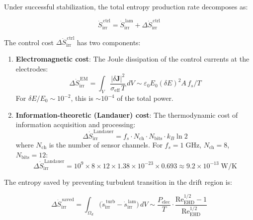 \documentclass[12pt,twocolumn]{article}
\newcommand{\jj}{\mathbf{J}}
\newcommand{\Sdot}{\dot{S}_{\mathrm{irr}}}
\newcommand{\sdot}{\dot{s}_{\mathrm{irr}}}
\newcommand{\Reehd}{\mathrm{Re}_{\mathrm{EHD}}}
\begin{document}
Under successful stabilization, the total entropy production rate
decomposes as:

\begin{equation}
  \Sdot^{\,\mathrm{ctrl}}
  = \Sdot^{\,\mathrm{lam}} + \Delta\Sdot^{\,\mathrm{ctrl}}
  \label{eq:entropy_decomp}
\end{equation}

The control cost $\Delta\Sdot^{\,\mathrm{ctrl}}$ has two components:

\begin{enumerate}
  \item \textbf{Electromagnetic cost}: The Joule dissipation of the
    control currents at the electrodes:
    \begin{equation}
      \Delta\Sdot^{\,\mathrm{EM}}
      = \int_V \frac{|\delta\jj|^2}{\sigma_{\mathrm{eff}}\,T}\,dV
      \sim \varepsilon_0 E_0 (\delta E)^2 A\,f_s / T
      \label{eq:entropy_EM}
    \end{equation}
    For $\delta E / E_0 \sim 10^{-2}$, this is $\sim 10^{-4}$ of
    the total power.

  \item \textbf{Information-theoretic (Landauer) cost}: The
    thermodynamic cost of information acquisition and processing:
    \begin{equation}
      \Delta\Sdot^{\,\mathrm{Landauer}}
      = f_s \cdot N_{\mathrm{ch}} \cdot N_{\mathrm{bits}}
        \cdot k_B \ln 2
      \label{eq:entropy_Landauer}
    \end{equation}
    where $N_{\mathrm{ch}}$ is the number of sensor channels. For
    $f_s = 1\;\mathrm{GHz}$, $N_{\mathrm{ch}} = 8$,
    $N_{\mathrm{bits}} = 12$:
    \begin{equation}
      \Delta\Sdot^{\,\mathrm{Landauer}}
      = 10^9 \times 8 \times 12 \times 1.38 \times 10^{-23}
        \times 0.693
      \approx 9.2 \times 10^{-13}\;\mathrm{W/K}
      \label{eq:landauer_numerical}
    \end{equation}
\end{enumerate}

The entropy saved by preventing turbulent transition in the drift
region is:

\begin{equation}
  \Delta\Sdot^{\,\mathrm{saved}}
  = \int_{\Omega_d} \bigl(\sdot^{\,\mathrm{turb}}
    - \sdot^{\,\mathrm{lam}}\bigr)\,dV
  \sim \frac{P_{\mathrm{elec}}}{T}
    \cdot \frac{\Reehd^{1/2} - 1}{\Reehd^{1/2}}
  \label{eq:entropy_saved}
\end{equation}
\end{document}
